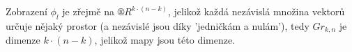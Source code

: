 \documentclass[12pt]{article}					%
\begin{document}
\begin{priklad}[2.]
        \begin{reseni}[Dimenze]
            Zobrazení $\phi_l$ je zřejmě na $®R^{k·(n-k)}$, jelikož každá nezávislá množina vektorů určuje nějaký prostor (a nezávislé jsou díky 'jedničkám a nulám'), tedy $Gr_{k, n}$ je dimenze $k·(n-k)$, jelikož mapy jsou této dimenze.


        \end{reseni}
    \end{priklad}

    \pagebreak
\end{document}

